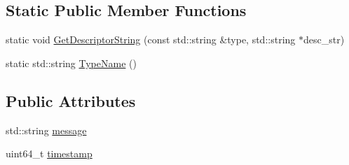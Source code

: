 \subsection*{Static Public Member Functions}
\begin{DoxyCompactItemize}
\item 
static void \hyperlink{structapollo_1_1cyber_1_1message_1_1RawMessage_a79dc2c337261c545d6b1c3b94dc74c84}{Get\-Descriptor\-String} (const std\-::string \&type, std\-::string $\ast$desc\-\_\-str)
\item 
static std\-::string \hyperlink{structapollo_1_1cyber_1_1message_1_1RawMessage_a2c7933b1ef21dfe58d944fc97bd7470e}{Type\-Name} ()
\end{DoxyCompactItemize}
\subsection*{Public Attributes}
\begin{DoxyCompactItemize}
\item 
std\-::string \hyperlink{structapollo_1_1cyber_1_1message_1_1RawMessage_a35cbf9f8f1e2e2560e5a461695afecb0}{message}
\item 
uint64\-\_\-t \hyperlink{structapollo_1_1cyber_1_1message_1_1RawMessage_af22d0984f33c49d17710308d7cb1d271}{timestamp}
\end{DoxyCompactItemize}


